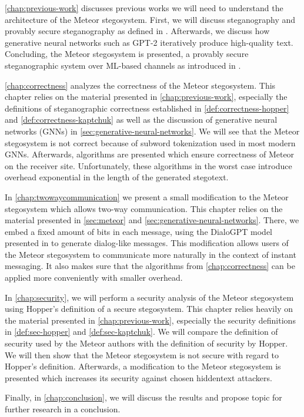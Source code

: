 \autoref{chap:previous-work} discusses previous works we will need to understand the architecture of the Meteor stegosystem.
First, we will discuss steganography and provably secure steganography as defined in \cite{Hopper2004}.
Afterwards, we discuss how generative neural networks such as GPT-2 iteratively produce high-quality text.
Concluding, the Meteor stegosystem is presented, a provably secure steganographic system over ML-based channels as introduced in \cite{Meteor2021}.

\autoref{chap:correctness} analyzes the correctness of the Meteor stegosystem. 
This chapter relies on the material presented in \autoref{chap:previous-work}, especially the definitions of steganographic correctness established in \autoref{def:correctness-hopper} and \autoref{def:correctness-kaptchuk} as well as the discussion of generative neural networks (GNNs) in \autoref{sec:generative-neural-networks}.
We will see that the Meteor stegosystem is not correct because of subword tokenization used in most modern GNNs.
Afterwards, algorithms are presented which ensure correctness of Meteor on the receiver site.
Unfortunately, these algorithms in the worst case introduce overhead exponential in the length of the generated stegotext.

In \autoref{chap:twowaycommunication} we present a small modification to the Meteor stegosystem which allows two-way communication.
This chapter relies on the material presented in \autoref{sec:meteor} and \autoref{sec:generative-neural-networks}.
There, we embed a fixed amount of bits in each message, using the DialoGPT model presented in \cite{Zhang2020} to generate dialog-like messages.
This modification allows users of the Meteor stegosystem to communicate more naturally in the context of instant messaging.
It also makes sure that the algorithms from \autoref{chap:correctness} can be applied more conveniently with smaller overhead.

In \autoref{chap:security}, we will perform a security analysis of the Meteor stegosystem using Hopper's definition of a secure stegosystem.
This chapter relies heavily on the material presented in \autoref{chap:previous-work}, especially the security definitions in \autoref{def:sec-hopper} and \autoref{def:sec-kaptchuk}.
We will compare the definition of security used by the Meteor authors with the definition of security by Hopper.
We will then show that the Meteor stegosystem is not secure with regard to Hopper's definition.
Afterwards, a modification to the Meteor stegosystem is presented which increases its security against chosen hiddentext attackers.

Finally, in \autoref{chap:conclusion}, we will discuss the results and propose topic for further research in a conclusion.